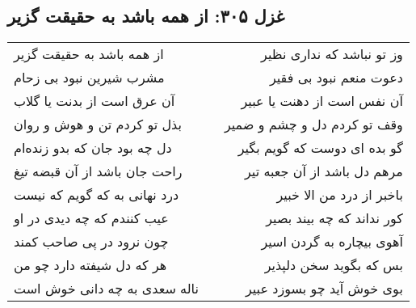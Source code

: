 \begin{center}
\section*{غزل ۳۰۵: از همه باشد به حقیقت گزیر}
\label{sec:305}
\begin{longtable}{l p{0.5cm} r}
از همه باشد به حقیقت گزیر
&&
وز تو نباشد که نداری نظیر
\\
مشرب شیرین نبود بی زحام
&&
دعوت منعم نبود بی فقیر
\\
آن عرق است از بدنت یا گلاب
&&
آن نفس است از دهنت یا عبیر
\\
بذل تو کردم تن و هوش و روان
&&
وقف تو کردم دل و چشم و ضمیر
\\
دل چه بود جان که بدو زنده‌ام
&&
گو بده ای دوست که گویم بگیر
\\
راحت جان باشد از آن قبضه تیغ
&&
مرهم دل باشد از آن جعبه تیر
\\
درد نهانی به که گویم که نیست
&&
باخبر از درد من الا خبیر
\\
عیب کنندم که چه دیدی در او
&&
کور نداند که چه بیند بصیر
\\
چون نرود در پی صاحب کمند
&&
آهوی بیچاره به گردن اسیر
\\
هر که دل شیفته دارد چو من
&&
بس که بگوید سخن دلپذیر
\\
ناله سعدی به چه دانی خوش است
&&
بوی خوش آید چو بسوزد عبیر
\\
\end{longtable}
\end{center}
